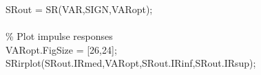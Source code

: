 \hspace{1mm}\hspace{5mm} \hspace{5mm} \hspace{5mm} \hspace{5mm} \hspace{5mm} \hspace{5mm} SRout = SR(VAR,SIGN,VARopt); \\ 
\hspace{1mm}\hspace{5mm} \hspace{5mm} \hspace{5mm} \hspace{5mm} \hspace{5mm} \hspace{5mm}  \\ 
\hspace{1mm}\hspace{5mm} \hspace{5mm} \hspace{5mm} \hspace{5mm} \hspace{5mm} \hspace{5mm} \textcolor{matlabgreen}{\% Plot impulse responses }\\ 
\hspace{1mm}\hspace{5mm} \hspace{5mm} \hspace{5mm} \hspace{5mm} \hspace{5mm} \hspace{5mm} VARopt.FigSize = [26,24]; \\ 
\hspace{1mm}\hspace{5mm} \hspace{5mm} \hspace{5mm} \hspace{5mm} \hspace{5mm} \hspace{5mm} SRirplot(SRout.IRmed,VARopt,SRout.IRinf,SRout.IRsup); \\ 
\hspace{1mm}\hspace{5mm} \hspace{5mm} \hspace{5mm} \hspace{5mm} \hspace{5mm} \hspace{5mm}  \\ 
